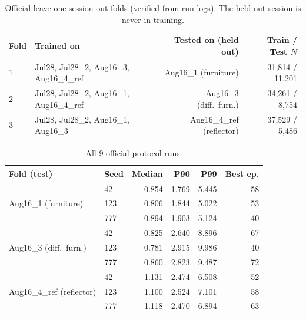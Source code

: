 \documentclass[11pt,a4paper]{article}
\begin{document}
\begin{table}[H]
\centering
\caption{Official leave-one-session-out folds (verified from run logs). The held-out session is
never in training.}
\begin{tabular}{@{}llr r@{}}
\toprule
\textbf{Fold} & \textbf{Trained on} & \textbf{Tested on (held out)} & \textbf{Train / Test $N$} \\
\midrule
1 & Jul28, Jul28\_2, Aug16\_3, Aug16\_4\_ref & Aug16\_1 (furniture)      & 31{,}814 / 11{,}201 \\
2 & Jul28, Jul28\_2, Aug16\_1, Aug16\_4\_ref & Aug16\_3 (diff.\ furn.)   & 34{,}261 / 8{,}754  \\
3 & Jul28, Jul28\_2, Aug16\_1, Aug16\_3      & Aug16\_4\_ref (reflector) & 37{,}529 / 5{,}486  \\
\bottomrule
\end{tabular}
\end{table}

\begin{table}[H]
\centering
\caption{All $9$ official-protocol runs.}
\begin{tabular}{@{}llrrrr@{}}
\toprule
\textbf{Fold (test)} & \textbf{Seed} & \textbf{Median} & \textbf{P90} & \textbf{P99} & \textbf{Best ep.} \\
\midrule
\multirow{3}{*}{Aug16\_1 (furniture)} & 42 & 0.854 & 1.769 & 5.445 & 58 \\
 & 123 & 0.806 & 1.844 & 5.022 & 53 \\
 & 777 & 0.894 & 1.903 & 5.124 & 40 \\
\midrule
\multirow{3}{*}{Aug16\_3 (diff.\ furn.)} & 42 & 0.825 & 2.640 & 8.896 & 67 \\
 & 123 & 0.781 & 2.915 & 9.986 & 40 \\
 & 777 & 0.860 & 2.823 & 9.487 & 72 \\
\midrule
\multirow{3}{*}{Aug16\_4\_ref (reflector)} & 42 & 1.131 & 2.474 & 6.508 & 52 \\
 & 123 & 1.100 & 2.524 & 7.101 & 58 \\
 & 777 & 1.118 & 2.470 & 6.894 & 63 \\
\bottomrule
\end{tabular}
\end{table}
\end{document}
